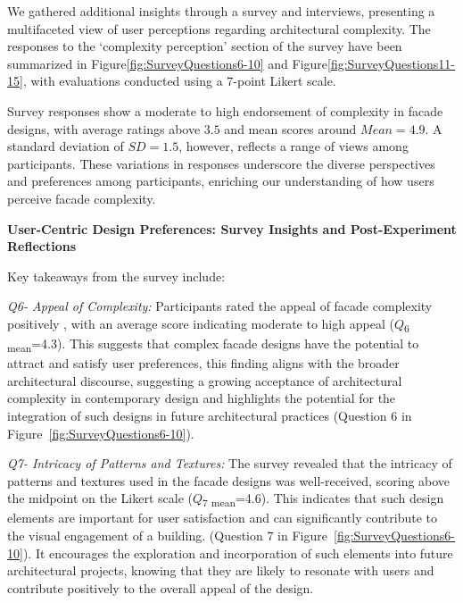 %    


We gathered additional insights through a survey and interviews, presenting a multifaceted view of user perceptions regarding architectural complexity.
The responses to the `complexity perception' section of the survey have been summarized in Figure\ref{fig:SurveyQuestions6-10} and Figure\ref{fig:SurveyQuestions11-15}, with evaluations conducted using a 7-point Likert scale.


Survey responses show a moderate to high endorsement of complexity in facade designs, with average ratings above \(3.5\) and mean scores around \(Mean = 4.9\).
A standard deviation of \(SD = 1.5\), however, reflects a range of views among participants.
These variations in responses underscore the diverse perspectives and preferences among participants, enriching our understanding of how users perceive facade complexity.

\textbf{User-Centric Design Preferences: Survey Insights and Post-Experiment Reflections}

Key takeaways from the survey include:


\textit{Q6- Appeal of Complexity:}
Participants rated the appeal of facade complexity positively , with an average score indicating moderate to high appeal (\(Q\)\textsubscript{\small{6 mean}}=4.3).
This suggests that complex facade designs have the potential to attract and satisfy user preferences, this finding aligns with the broader architectural discourse, suggesting a growing acceptance of architectural complexity in contemporary design and highlights the potential for the integration of such designs in future architectural practices (Question 6 in Figure~\ref{fig:SurveyQuestions6-10}).

\textit{Q7-  Intricacy of Patterns and Textures:}
The survey revealed that the intricacy of patterns and textures used in the facade designs was well-received, scoring above the midpoint on the Likert scale (\(Q\)\textsubscript{\small{7 mean}}=4.6).
This indicates that such design elements are important for user satisfaction and can significantly contribute to the visual engagement of a building.
(Question 7 in Figure~\ref{fig:SurveyQuestions6-10}).
It encourages the exploration and incorporation of such elements into future architectural projects, knowing that they are likely to resonate with users and contribute positively to the overall appeal of the design.

